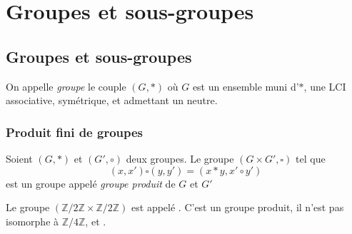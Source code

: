 \documentclass[11pt,a4paper,fleqn,pdftex]{report}
\begin{document}
\chapter{Groupes et sous-groupes}
\section{Groupes et sous-groupes} %
\label{sec:definition_d_un_groupe}
\begin{dfn}[Groupe]
     On appelle \emph{groupe} le couple $(G,*)$ où $G$ est un ensemble muni d'$*$, une \gls{LCI} associative, symétrique, et admettant un neutre.
\end{dfn}
\subsection{Produit fini de groupes} %
\label{sub:produit_fini_de_groupes}
\begin{dfn}
     Soient $(G,*)$ et $(G',\circ)$ deux groupes. \newline
     Le groupe $\left( G\times G', \square \right)$ tel que
     \[
         (x,x')\square (y,y') = (x*y,x'\circ y')
     \]
     est un groupe appelé \emph{groupe produit} de $G$ et $G'$
\end{dfn}
\begin{exemple}\label{ex:groupe_de_klein}
     Le groupe $(\mathbb{Z}/2\mathbb{Z} \times \mathbb{Z}/2\mathbb{Z})$ est appelé . C'est un groupe produit, il n'est pas isomorphe à $\mathbb{Z}/4\mathbb{Z}$, et . 
\end{exemple}
\end{document}
